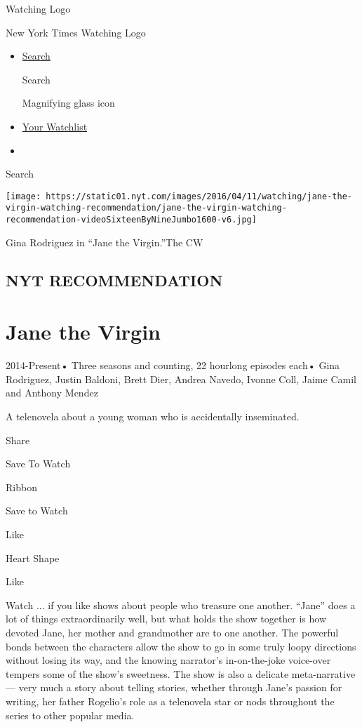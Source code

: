 \href{/watching}{}

Watching Logo

New York Times Watching Logo

\begin{itemize}
\item
  \href{/watching/search}{Search}

  Search

  Magnifying glass icon
\item
  \href{/watching/watchlist}{Your Watchlist}
\item
\end{itemize}

Search

\texttt{[image: https://static01.nyt.com/images/2016/04/11/watching/jane-the-virgin-watching-recommendation/jane-the-virgin-watching-recommendation-videoSixteenByNineJumbo1600-v6.jpg]}

Gina Rodriguez in ``Jane the Virgin.''The CW

\hypertarget{nyt-recommendation}{%
\subsection{NYT RECOMMENDATION}\label{nyt-recommendation}}

\hypertarget{jane-the-virgin}{%
\section{Jane the Virgin}\label{jane-the-virgin}}

2014-Present• Three seasons and counting, 22 hourlong episodes each•
Gina Rodriguez, Justin Baldoni, Brett Dier, Andrea Navedo, Ivonne Coll,
Jaime Camil and Anthony Mendez

A telenovela about a young woman who is accidentally inseminated.

Share

Save To Watch

Ribbon

Save to Watch

Like

Heart Shape

Like

Watch ... if you like shows about people who treasure one another.
``Jane'' does a lot of things extraordinarily well, but what holds the
show together is how devoted Jane, her mother and grandmother are to one
another. The powerful bonds between the characters allow the show to go
in some truly loopy directions without losing its way, and the knowing
narrator's in-on-the-joke voice-over tempers some of the show's
sweetness. The show is also a delicate meta-narrative --- very much a
story about telling stories, whether through Jane's passion for writing,
her father Rogelio's role as a telenovela star or nods throughout the
series to other popular media.

